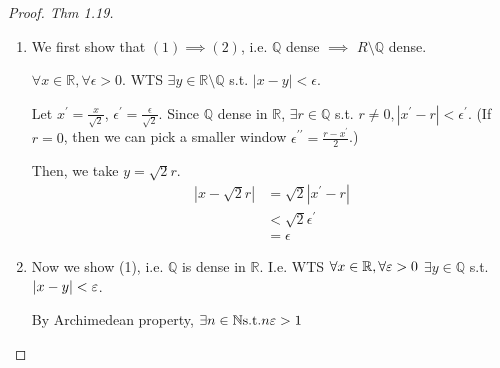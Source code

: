 \begin{proof}[Proof. Thm 1.19]
    \begin{enumerate}
        \item 
    We first show that $(1) \implies (2)$, i.e. $\mathbb{Q}$ dense $\implies$ 
    ${R} \setminus \mathbb{Q}$ dense. 
    \medskip 

    $\forall x \in \mathbb{R}, \forall \epsilon > 0$. WTS 
    $\exists y \in \mathbb{R} \setminus \mathbb{Q}$ s.t. $|x - y| < \epsilon$. 
    \medskip

    Let $x^{\prime} = \frac{x}{\sqrt{2}}$, 
    $\epsilon^{\prime} = \frac{\epsilon}{\sqrt{2}}$. 
    Since $\mathbb{Q}$ dense in $\mathbb{R}$, 
    $\exists r \in \mathbb{Q}$ s.t. $r \neq 0, \left| x^{\prime} - r \right| < \epsilon^{\prime}$. (If $r = 0$, then we can pick a smaller window $\epsilon^{\prime \prime} = \frac{r - x^{\prime}}{2}$.)

    \begin{center}
    \end{center}


    Then, we take $y = \sqrt{2} r$. 
    \begin{align*}
        |x - \sqrt{2} r| &= \sqrt{2} |x^{\prime} - r| \\
        & < \sqrt{2} \epsilon^{\prime} \\
        & = \epsilon
    \end{align*}

    \item 
Now we show (1), i.e. $\mathbb{Q}$ is dense in $\mathbb{R}$. 
I.e. WTS $\forall x \in \mathbb{R}, \forall \varepsilon > 0$
$\exists y \in \mathbb{Q}$ s.t. 
$|x - y | < \varepsilon$. 
\medskip 

By Archimedean property, $\exists n \in \mathbb{N} \text{s.t.} n \varepsilon > 1$
\medskip

\begin{center}
\end{center}
\end{enumerate}
\end{proof}
